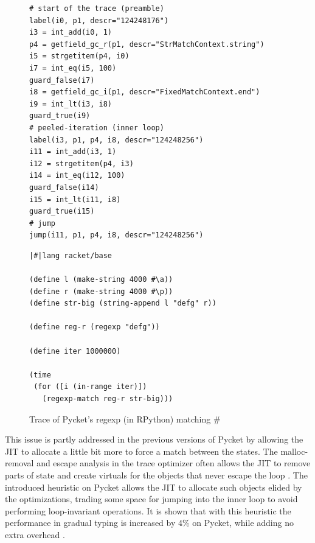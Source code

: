\begin{figure}
    \vspace{-0.5cm}
    \centering
    \begin{minipage}[t]{0.38\textwidth}
      \begin{verbatim}
# start of the trace (preamble)
label(i0, p1, descr="124248176")
i3 = int_add(i0, 1)
p4 = getfield_gc_r(p1, descr="StrMatchContext.string")
i5 = strgetitem(p4, i0)
i7 = int_eq(i5, 100)
guard_false(i7)
i8 = getfield_gc_i(p1, descr="FixedMatchContext.end")
i9 = int_lt(i3, i8)
guard_true(i9)
# peeled-iteration (inner loop)
label(i3, p1, p4, i8, descr="124248256")
i11 = int_add(i3, 1)
i12 = strgetitem(p4, i3)
i14 = int_eq(i12, 100)
guard_false(i14)
i15 = int_lt(i11, i8)
guard_true(i15)
# jump
jump(i11, p1, p4, i8, descr="124248256")
    \end{verbatim}
    \end{minipage}
    \begin{minipage}[t]{0.38\textwidth}
      \begin{verbatim}
|#|lang racket/base

(define l (make-string 4000 #\a))
(define r (make-string 4000 #\p))
(define str-big (string-append l "defg" r))

(define reg-r (regexp "defg"))

(define iter 1000000)

(time
 (for ([i (in-range iter)])
   (regexp-match reg-r str-big)))
    \end{verbatim}
    \end{minipage}
    \caption{\small Trace of Pycket's regexp (in RPython) matching
      $\mathtt{\#}$}
    \label{fig:regexp-trace}
  \end{figure}

This issue is partly addressed in the previous versions of Pycket by
allowing the JIT to allocate a little bit more to force a match
between the states. The malloc-removal and escape analysis in the
trace optimizer often allows the JIT to remove parts of state and
create virtuals for the objects that never escape the loop
\cite{malloc-removal:11, loop-aware:12}. The introduced heuristic on
Pycket allows the JIT to allocate such objects elided by the
optimizations, trading some space for jumping into the inner loop to
avoid performing loop-invariant operations. It is shown that with this
heuristic the performance in gradual typing is increased by 4\% on
Pycket, while adding no extra overhead \cite{pycket17}.

